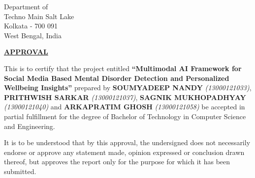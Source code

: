 \thispagestyle{plain}

\noindent
Department of {\mydep} \\
Techno Main Salt Lake \\
Kolkata - 700 091\\
West Bengal, India

\vspace{0.5\baselineskip}
\vspace{1\baselineskip}

\begin{center}
{\Large {\bf \underline{ \uppercase{Approval}}}}
\end{center}

\vspace{\baselineskip}

\noindent

\begin{center}
   This is to certify that the project entitled \textbf{“Multimodal AI Framework for Social Media Based Mental Disorder Detection and Personalized Wellbeing Insights”} prepared by \textbf{SOUMYADEEP NANDY}   \emph{(13000121033)}, \textbf{PRITHWISH SARKAR} \emph{(13000121037)}, \textbf{SAGNIK MUKHOPADHYAY} \emph{(13000121040)} and \textbf{ARKAPRATIM GHOSH} \emph{(13000121058)} be accepted in
partial fulfillment for the degree of Bachelor of Technology in Computer Science and Engineering. 
\end{center}


\begin{center}
    \vspace{1\baselineskip}
It is to be understood that by this approval, the undersigned does not necessarily endorse or approve any statement made, opinion expressed or conclusion drawn thereof, but
approves the report only for the purpose for which it has been submitted.
\end{center}




